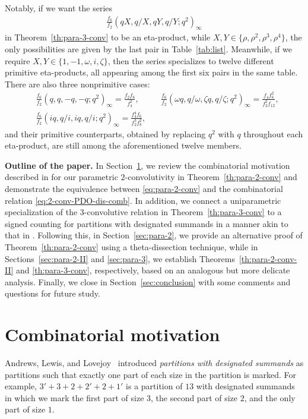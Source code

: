 \documentclass[12pt,reqno]{amsart}
\numberwithin{equation}{section}
\theoremstyle{plain}
\theoremstyle{definition}
\theoremstyle{named}
\begin{document}
Notably, if we want the series
\begin{align*}
	\frac{f_6}{f_2} (qX,q/X,qY,q/Y;q^2)_\infty
\end{align*}
in Theorem~\ref{th:para-3-conv} to be an eta-product, while $X,Y\in \{\rho,\rho^2,\rho^3,\rho^4\}$, the only possibilities are given by the last pair in Table~\ref{tab:list}. Meanwhile, if we require $X,Y\in \{1,-1,\omega,i,\zeta\}$, then the series specializes to twelve different primitive eta-products, all appearing among the first six pairs in the same table. There are also three nonprimitive cases:
\begin{align*}
	&\frac{f_6}{f_2} (q,q,-q,-q;q^2)_\infty = \frac{f_2f_6}{f_4^2}, \quad && \frac{f_6}{f_2} (\omega q,q/\omega,\zeta q,q/\zeta;q^2)_\infty = \frac{f_4f_6^2}{f_2^2f_{12}},\\
	&\frac{f_6}{f_2} (iq,q/i,iq,q/i;q^2)_\infty = \frac{f_4^4f_6}{f_2^3f_8^2},
\end{align*}
and their primitive counterparts, obtained by replacing $q^2$ with $q$ throughout each eta-product, are still among the aforementioned twelve members. 


\textbf{Outline of the paper.} In Section~\ref{sec:para-2-comb}, we review the combinatorial motivation described in \cite{FuSel} for our parametric $2$-convolutivity in Theorem~\ref{th:para-2-conv} and demonstrate the equivalence between \eqref{eq:para-2-conv} and the combinatorial relation \eqref{eq:2-conv-PDO-dis-comb}. In addition, we connect a uniparametric specialization of the $3$-convolutive relation in Theorem~\ref{th:para-3-conv} to a signed counting for partitions with designated summands in a manner akin to that in \cite{FuSel}. Following this, in Section~\ref{sec:para-2}, we provide an alternative proof of Theorem~\ref{th:para-2-conv} using a theta-dissection technique, while in Sections~\ref{sec:para-2-II} and \ref{sec:para-3}, we establish Theorems~\ref{th:para-2-conv-II} and \ref{th:para-3-conv}, respectively, based on an analogous but more delicate analysis. Finally, we close in Section~\ref{sec:conclusion} with some comments and questions for future study.

\section{Combinatorial motivation}\label{sec:para-2-comb}

Andrews, Lewis, and Lovejoy~\cite{ALL2002} introduced \emph{partitions with designated summands} as partitions such that exactly one part of each size in the partition is marked. For example, $3'+3+2+2'+2+1'$ is a partition of $13$ with designated summands in which we mark the first part of size $3$, the second part of size $2$, and the only part of size $1$.
\end{document}
